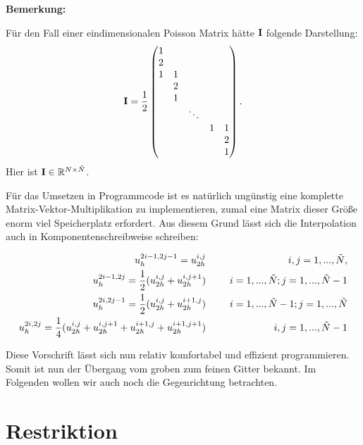 \textbf{Bemerkung:}

Für den Fall einer eindimensionalen Poisson Matrix hätte ${\textbf{I}}$ folgende Darstellung:
\begin{equation}
{\textbf{I}} = \frac {1} {2}
\begin{pmatrix}
1\\
2\\
1 & 1\\
  & 2\\
  & 1\\
  &   & \ddots\\
  &   &          & 1 & 1\\
  &   &          &   & 2\\
  &   &          &   & 1
\end{pmatrix}.
\end{equation}
Hier ist ${\textbf{I}} \in \mathbb{R}^{N \times \tilde N}$.


Für das Umsetzen in Programmcode ist es natürlich ungünstig eine komplette Matrix-Vektor-Multiplikation zu implementieren, zumal eine Matrix dieser Größe enorm viel Speicherplatz erfordert. Aus diesem Grund lässt sich die Interpolation auch in Komponentenschreibweise schreiben:

\begin{eqnarray}
u_{h}^{2i-1,2j-1} = u_{2h}^{i,j} &\hspace{0.5cm}& i,j = 1,...,\tilde N, \\
u_{h}^{2i-1,2j} = \frac{1}{2} (u_{2h}^{i,j} + u_{2h}^{i,j+1}) &\hspace{0.5cm}& i = 1,...,\tilde N; j = 1,...,\tilde N - 1 \\
u_{h}^{2i,2j-1} = \frac{1}{2} (u_{2h}^{i,j} + u_{2h}^{i+1,j}) &\hspace{0.5cm}& i = 1,...,\tilde N - 1; j = 1,...,\tilde N \\
u_{h}^{2i,2j} = \frac{1}{4} (u_{2h}^{i,j} + u_{2h}^{i,j+1} + u_{2h}^{i+1,j} + u_{2h}^{i+1,j+1}) &\hspace{0.5cm}& i,j = 1,...,\tilde N - 1
\end{eqnarray}

Diese Vorschrift lässt sich nun relativ komfortabel und effizient programmieren. Somit ist nun der Übergang vom groben zum feinen Gitter bekannt. Im Folgenden wollen wir auch noch die Gegenrichtung betrachten.

\section{Restriktion}

